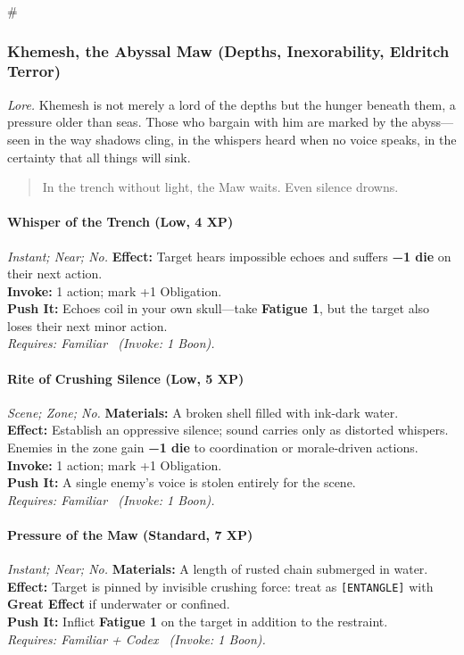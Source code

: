 # %

\subsubsection{Khemesh, the Abyssal Maw (Depths, Inexorability, Eldritch Terror)}
\textit{Lore.} Khemesh is not merely a lord of the depths but the hunger beneath them, a pressure older than seas. Those who bargain with him are marked by the abyss—seen in the way shadows cling, in the whispers heard when no voice speaks, in the certainty that all things will sink.

\begin{quote}
In the trench without light, the Maw waits. Even silence drowns.
\end{quote}

\paragraph*{Whisper of the Trench (Low, 4 XP)} \emph{Instant; Near; No.}
\textbf{Effect:} Target hears impossible echoes and suffers \textbf{−1 die} on their next action.\\
\textbf{Invoke:} 1 action; mark +1 Obligation.\\
\textbf{Push It:} Echoes coil in your own skull—take \textbf{Fatigue 1}, but the target also loses their next minor action.\\
\emph{Requires: Familiar \ (\textit{Invoke:} 1 Boon).}

\paragraph*{Rite of Crushing Silence (Low, 5 XP)} \emph{Scene; Zone; No.}
\textbf{Materials:} A broken shell filled with ink-dark water.\\
\textbf{Effect:} Establish an oppressive silence; sound carries only as distorted whispers. Enemies in the zone gain \textbf{−1 die} to coordination or morale-driven actions.\\
\textbf{Invoke:} 1 action; mark +1 Obligation.\\
\textbf{Push It:} A single enemy's voice is stolen entirely for the scene.\\
\emph{Requires: Familiar \ (\textit{Invoke:} 1 Boon).}

\paragraph{Pressure of the Maw (Standard, 7 XP)} \emph{Instant; Near; No.}
\textbf{Materials:} A length of rusted chain submerged in water.\\
\textbf{Effect:} Target is pinned by invisible crushing force: treat as \texttt{[ENTANGLE]} with \textbf{Great Effect} if underwater or confined.\\
\textbf{Push It:} Inflict \textbf{Fatigue 1} on the target in addition to the restraint.\\
\emph{Requires: Familiar + Codex \ (\textit{Invoke:} 1 Boon).}

